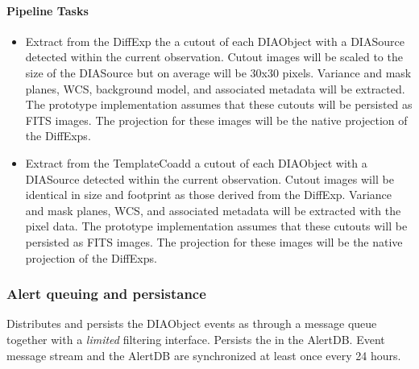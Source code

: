 \paragraph{Pipeline Tasks}
 \begin{itemize}
\item Extract from the DiffExp the a cutout of each DIAObject with a DIASource detected within the current observation.  Cutout images will be scaled to the size of the DIASource but on average will be 30x30 pixels. Variance and mask planes, WCS, background model, and associated metadata will be extracted. The prototype implementation assumes that these cutouts will be persisted as FITS images. The projection for these images will be the native projection of the DiffExps.

\item Extract from the TemplateCoadd  a cutout of each DIAObject with a DIASource detected within the current observation.  Cutout images will be identical in size and footprint as those derived from the DiffExp. Variance and mask planes, WCS, and associated metadata will be extracted with the pixel data. The prototype implementation assumes that these cutouts will be persisted as FITS images. The projection for these images will be the native projection of the DiffExps.
\end{itemize}

\subsubsection{Alert queuing and persistance}
\label{sec:apQueue}
Distributes and persists the DIAObject events as \VOEvents through a message queue together with a {\it limited} filtering interface. Persists the \VOEvents in the AlertDB. Event message stream and the AlertDB are synchronized at least once every 24 hours.


